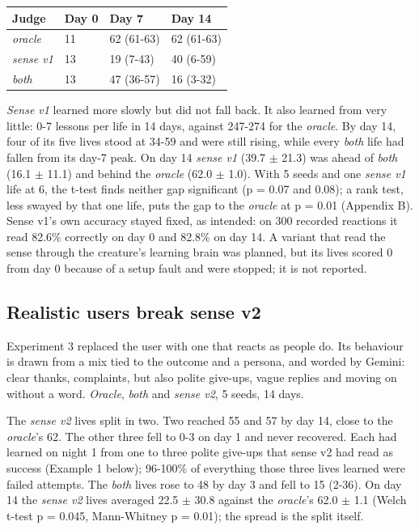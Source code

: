 {\def\LTcaptype{none} %
\begin{longtable}[]{@{}llll@{}}
\toprule\noalign{}
Judge & Day 0 & Day 7 & Day 14 \\
\midrule\noalign{}
\endhead
\bottomrule\noalign{}
\endlastfoot
\emph{oracle} & 11 & 62 (61-63) & 62 (61-63) \\
\emph{sense v1} & 13 & 19 (7-43) & 40 (6-59) \\
\emph{both} & 13 & 47 (36-57) & 16 (3-32) \\
\end{longtable}
}

\emph{Sense v1} learned more slowly but did not fall back. It also learned from very little: 0-7 lessons per life in 14 days, against 247-274 for the \emph{oracle}. By day 14, four of its five lives stood at 34-59 and were still rising, while every \emph{both} life had fallen from its day-7 peak. On day 14 \emph{sense v1} (39.7 $\pm$ 21.3) was ahead of \emph{both} (16.1 $\pm$ 11.1) and behind the \emph{oracle} (62.0 $\pm$ 1.0). With 5 seeds and one \emph{sense v1} life at 6, the t-test finds neither gap significant (p = 0.07 and 0.08); a rank test, less swayed by that one life, puts the gap to the \emph{oracle} at p = 0.01 (Appendix B). Sense v1's own accuracy stayed fixed, as intended: on 300 recorded reactions it read 82.6\% correctly on day 0 and 82.8\% on day 14. A variant that read the sense through the creature's learning brain was planned, but its lives scored 0 from day 0 because of a setup fault and were stopped; it is not reported.

\subsection{Realistic users break sense v2}

Experiment 3 replaced the user with one that reacts as people do. Its behaviour is drawn from a mix tied to the outcome and a persona, and worded by Gemini: clear thanks, complaints, but also polite give-ups, vague replies and moving on without a word. \emph{Oracle}, \emph{both} and \emph{sense v2}, 5 seeds, 14 days.

The \emph{sense v2} lives split in two. Two reached 55 and 57 by day 14, close to the \emph{oracle}'s 62. The other three fell to 0-3 on day 1 and never recovered. Each had learned on night 1 from one to three polite give-ups that sense v2 had read as success (Example 1 below); 96-100\% of everything those three lives learned were failed attempts. The \emph{both} lives rose to 48 by day 3 and fell to 15 (2-36). On day 14 the \emph{sense v2} lives averaged 22.5 $\pm$ 30.8 against the \emph{oracle}'s 62.0 $\pm$ 1.1 (Welch t-test p = 0.045, Mann-Whitney p = 0.01); the spread is the split itself.

